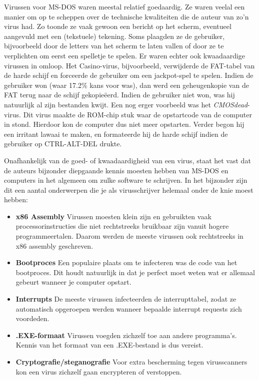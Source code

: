 Virussen voor MS-DOS waren meestal relatief goedaardig. Ze waren veelal een manier om op te scheppen over de technische kwaliteiten die de auteur van zo'n virus had. Zo toonde ze vaak gewoon een bericht op het scherm, eventueel aangevuld met een (tekstuele) tekening. Soms plaagden ze de gebruiker, bijvoorbeeld door de letters van het scherm te laten vallen of door ze te verplichten om eerst een spelletje te spelen. Er waren echter ook kwaadaardige virussen in omloop. Het Casino-virus, bijvoorbeeld, verwijderde de FAT-tabel van de harde schijf en forceerde de gebruiker om een jackpot-spel te spelen. Indien de gebruiker won (waar 17.2\% kans voor was), dan werd een geheugenkopie van de FAT terug naar de schijf gekopie\"eerd. Indien de gebruiker niet won, was hij natuurlijk al zijn bestanden kwijt. Een nog erger voorbeeld was het \emph{CMOSdead}-virus. Dit virus maakte de ROM-chip stuk waar de opstartcode van de computer in stond. Hierdoor kon de computer dus niet meer opstarten. Verder begon hij een irritant lawaai te maken, en formateerde hij de harde schijf indien de gebruiker op CTRL-ALT-DEL drukte.

Onafhankelijk van de goed- of kwaadaardigheid van een virus, staat het vast dat de auteurs bijzonder diepgaande kennis moesten hebben van MS-DOS en computers in het algemeen om zulke software te schrijven. In het bijzonder zijn dit een aantal onderwerpen die je als virusschrijver helemaal onder de knie moest hebben:

\begin{itemize}
\item{\textbf{x86 Assembly}} Virussen moesten klein zijn en gebruikten vaak processorinstructies die niet rechtstreeks bruikbaar zijn vanuit hogere programmeertalen. Daarom werden de meeste virussen ook rechtstreeks in x86 assembly geschreven.
\item{\textbf{Bootproces}} Een populaire plaats om te infecteren was de code van het bootproces. Dit houdt natuurlijk in dat je perfect moet weten wat er allemaal gebeurt wanneer je computer opstart.
\item{\textbf{Interrupts}} De meeste virussen infecteerden de interrupttabel, zodat ze automatisch opgeroepen werden wanneer bepaalde interrupt requests zich voordeden.
\item{\textbf{.EXE-formaat}} Virussen voegden zichzelf toe aan andere programma's. Kennis van het formaat van een .EXE-bestand is dus vereist.
\item{\textbf{Cryptografie/steganografie}} Voor extra bescherming tegen virusscanners kon een virus zichzelf gaan encrypteren of verstoppen.
\end{itemize}

